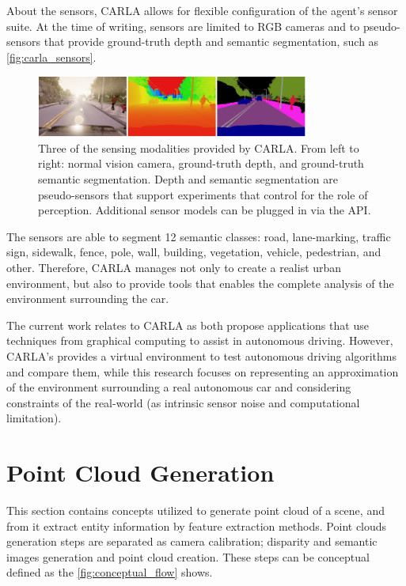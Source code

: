    About the sensors, CARLA allows for flexible configuration of the agent’s sensor suite. At the time of writing, sensors are limited to RGB cameras and to pseudo-sensors that provide ground-truth depth and semantic segmentation, such as \autoref{fig:carla_sensors}.
    
     \begin{figure}[H]
     \caption{\label{fig:carla_sensors}
Three of the sensing modalities provided by CARLA. From left to right: normal vision camera, ground-truth depth, and ground-truth semantic segmentation. Depth and semantic segmentation are pseudo-sensors that support experiments that control for the role of perception. Additional sensor models can be plugged in via the API.}
     \begin{center}
        \includegraphics[width=0.8\textwidth]{images/sensor_carla.png}
     \end{center}
    \end{figure} 

    The sensors are able to segment 12 semantic classes: road, lane-marking, traffic sign, sidewalk, fence, pole, wall, building, vegetation, vehicle, pedestrian, and other. Therefore, CARLA manages not only to create a realist urban environment, but also to provide tools that enables the complete analysis of the environment surrounding the car.
    
    The current work relates to CARLA as both propose applications that use techniques from graphical computing to assist in autonomous driving. However, CARLA's provides a virtual environment to test autonomous driving algorithms and compare them, while this research focuses on representing an approximation of the environment surrounding a real autonomous car and considering constraints of the real-world (as intrinsic sensor noise and computational limitation).

\section{Point Cloud Generation}

    This section contains concepts utilized to generate point cloud of a scene, and from it extract entity information by feature extraction methods. Point clouds generation steps are separated as camera calibration; disparity and semantic images generation and point cloud creation. These steps can be conceptual defined as the \autoref{fig:conceptual_flow} shows. 
    
